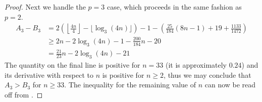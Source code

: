 \begin{proof}
  Next we handle the $p=3$ case, which proceeds in the same fashion as $p=2$.
  \begin{align*}
    A_3 - B_3
    &= 2 \left( \left\lfloor \frac{4n}{4} \right\rfloor - \lfloor \log_3(4n) \rfloor \right) - 1 - \left( \frac{25}{184}(8n-1) + 19 + \frac{1133}{1472} \right) \\
    &\geq 2n - 2\log_3(4n) - 1 - \frac{200}{184}n - 20 \\
    &= \frac{21}{23}n - 2\log_3(4n) - 21      
  \end{align*}
  The quantity on the final line is positive for $n=33$ (it is approximately $0.24$) and its derivative with respect to $n$ is positive for $n \geq 2$, thus we may conclude that $A_3>B_3$ for $n \geq 33$.
  The inequality for the remaining value of $n$ can now be read off from .


\end{proof}
